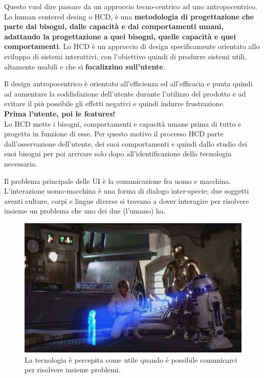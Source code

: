 Questo vuol dire passare da un approccio tecno-centrico ad uno antropocentrico. Lo human centered desing o HCD, è una \textbf{metodologia di progettazione che parte dai bisogni, dalle capacità e dai comportamenti umani, adattando la progettazione a quei bisogni, quelle capacità e quei comportamenti}. Lo HCD è un approccio di design specificamente orientato allo sviluppo di sistemi interattivi, con l'obiettivo quindi di produrre sistemi utili, altamente usabili e che si \textbf{focalizzino sull'utente}.

Il design antropocentrico è orientato all'efficienza ed all'efficacia e punta quindi ad aumentare la soddisfazione dell'utente durante l'utilizzo del prodotto e ad evitare il più possibile gli effetti negativi e quindi indurre frustrazione.\\

\textbf{Prima l'utente, poi le features!} \\

Lo HCD mette i bisogni, comportamenti e capacità umane prima di tutto e progetta in funzione di esse. Per questo motivo il processo HCD parte dall'osservazione dell'utente, dei suoi comportamenti e quindi dallo studio dei suoi bisogni per poi arrivare solo dopo all'identificazione della tecnologia necessaria.

Il problema principale delle UI è la comunicazione fra uomo e macchina. L'interazione uomo-macchina è una forma di dialogo inter-specie; due soggetti aventi culture, corpi e lingue diverse si trovano a dover interagire per risolvere insieme un problema che uno dei due (l'umano) ha. 

\begin{figure}[!h]
	\centering
	\includegraphics[width=\textwidth]{../immagini/starwars.jpg}
	\caption{La tecnologia è percepita come utile quando è possibile comunicarci per risolvere insieme problemi.}
\end{figure}

